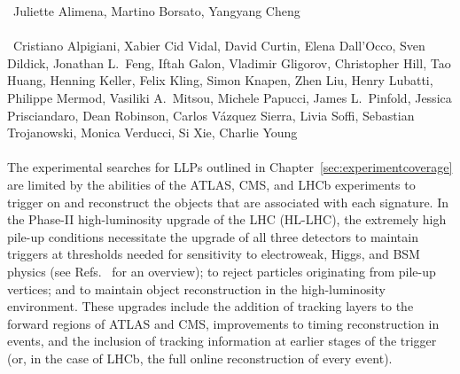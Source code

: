 

~Juliette Alimena, Martino Borsato, Yangyang Cheng\\
\text{ \; }\\
~Cristiano Alpigiani, Xabier Cid Vidal, David Curtin, Elena Dall'Occo, Sven Dildick, Jonathan L.~Feng, Iftah Galon, Vladimir Gligorov, Christopher Hill, Tao Huang, Henning Keller, Felix Kling, Simon Knapen, Zhen Liu, Henry Lubatti, Philippe Mermod, Vasiliki A.\ Mitsou, Michele Papucci, James L.~Pinfold, Jessica Prisciandaro, Dean Robinson, Carlos V\'azquez Sierra, Livia Soffi, Sebastian Trojanowski, Monica Verducci, Si Xie, Charlie Young\\
\text{ \; }\\

\noindent The experimental searches for LLPs outlined in Chapter~\ref{sec:experimentcoverage} are limited by the abilities of the ATLAS, CMS, and LHCb experiments to trigger on and reconstruct the objects that are associated with each signature. In the Phase-II high-luminosity upgrade of the LHC (HL-LHC), the extremely high pile-up conditions necessitate the upgrade of all three detectors to maintain triggers at thresholds needed for sensitivity to electroweak, Higgs, and BSM physics (see
Refs.~\cite{Schmidt:2016jra,Apollinari:2015bam} for an overview); to reject particles originating from pile-up vertices; and to maintain object reconstruction in the high-luminosity environment. These upgrades include the addition of tracking layers to the forward regions of ATLAS and CMS, improvements to timing reconstruction in events, and the inclusion of tracking information at earlier stages of the trigger (or, in the case of LHCb, the full online reconstruction of every event).


